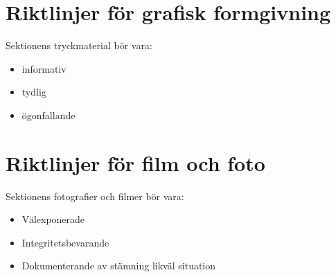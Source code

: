 \documentclass[]{dsekkallelse}
\begin{document}
\section{Riktlinjer för grafisk formgivning}
Sektionens tryckmaterial bör vara:
\begin{itemize}
    \item informativ
    \item tydlig
    \item ögonfallande
\end{itemize}

\section{Riktlinjer för film och foto}
Sektionens fotografier och filmer bör vara:
\begin{itemize}
    \item Välexponerade
    \item Integritetsbevarande
    \item Dokumenterande av stämning likväl situation
\end{itemize}



\end{document}
